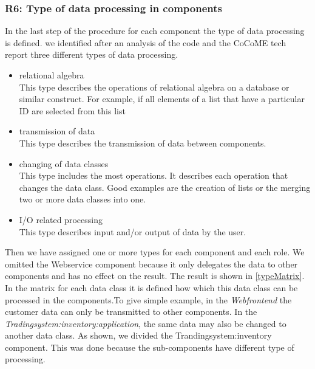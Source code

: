 \subsubsection{R6: Type of data processing in components}
\label{relevantpartsCoCoME}
In the last step of the procedure for each component the type of data processing is defined. we identified after an analysis of the code and the CoCoME tech report three different types of data processing.
\begin{itemize}
\item relational algebra \\ This type describes the operations of relational algebra on a database or similar construct. For example, if all elements of a list that have a particular ID are selected from this list
\item transmission of data \\ This type describes the transmission of data between components.
\item changing of data classes \\ This type includes the most operations. It describes each operation that changes the data class. Good examples are the creation of lists or the merging two or more data classes into one.
\item I/O related processing \\  This type describes input and/or output of data by the user. 
\end{itemize}
Then we have assigned one or more types for each component and each role. We omitted the Webservice component because it only delegates the data to other components and has no effect on the result. The result is shown in \autoref{typeMatrix}. In the matrix for each data class it is defined how which this data class can be processed in the components.To give simple example, in the \textit{Webfrontend} the customer data can only be transmitted to other components. In the \textit{Tradingsystem:inventory:application}, the same data may also be changed to another data class. As shown, we divided the Trandingsystem:inventory component. This was done because the sub-components have different type of processing. 

